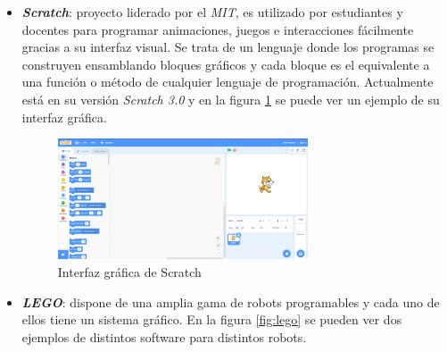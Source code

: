 \begin{itemize}
    \item \textit{\textbf{Scratch}}\cite{bib:scratch}: proyecto liderado por el \textit{MIT}, es utilizado por estudiantes y docentes para programar animaciones, juegos e interacciones fácilmente gracias a su interfaz visual. Se trata de un lenguaje donde los programas se construyen ensamblando bloques gráficos y cada bloque es el equivalente a una función o método de cualquier lenguaje de programación. Actualmente está en su versión \textit{Scratch 3.0} y en la figura \ref{fig:scratch} se puede ver un ejemplo de su interfaz gráfica. 
    \begin{figure}[H]
    \centering
    \includegraphics[width=0.7\textwidth]{img/scratch.jpg}
    \caption{Interfaz gráfica de Scratch} \label{fig:scratch}
    \end{figure}

    \item \textit{\textbf{LEGO}}\cite{bib:lego}: dispone de una amplia gama de robots programables y cada uno de ellos tiene un sistema gráfico. En la figura \ref{fig:lego} se pueden ver dos ejemplos de distintos software para distintos robots.  
    

\end{itemize}
